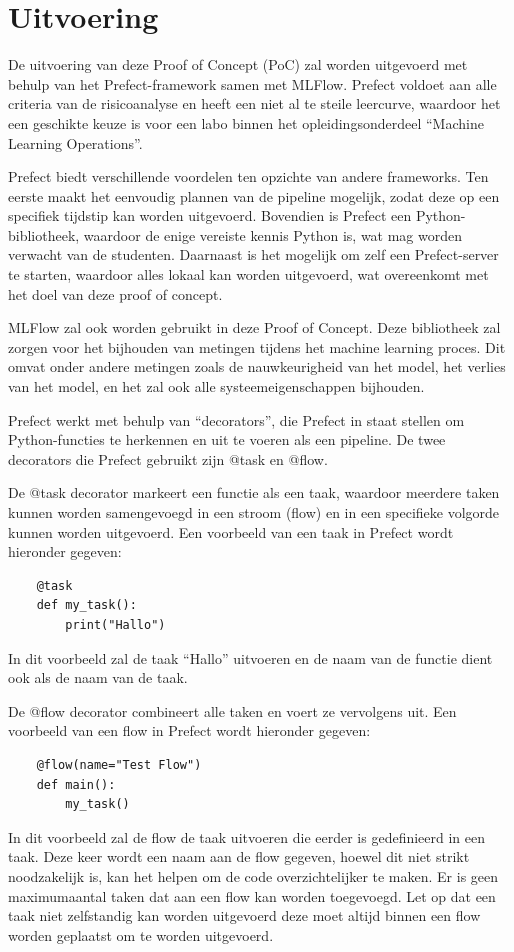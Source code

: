 \section{Uitvoering}
De uitvoering van deze Proof of Concept (PoC) zal worden uitgevoerd met behulp van het Prefect-framework samen met MLFlow. Prefect voldoet aan alle criteria van de risicoanalyse en heeft een niet al te steile leercurve, waardoor het een geschikte keuze is voor een labo binnen het opleidingsonderdeel ``Machine Learning Operations''.

Prefect biedt verschillende voordelen ten opzichte van andere frameworks. Ten eerste maakt het eenvoudig plannen van de pipeline mogelijk, zodat deze op een specifiek tijdstip kan worden uitgevoerd. Bovendien is Prefect een Python-bibliotheek, waardoor de enige vereiste kennis Python is, wat mag worden verwacht van de studenten. Daarnaast is het mogelijk om zelf een Prefect-server te starten, waardoor alles lokaal kan worden uitgevoerd, wat overeenkomt met het doel van deze proof of concept.

MLFlow zal ook worden gebruikt in deze Proof of Concept. Deze bibliotheek zal zorgen voor het bijhouden van metingen tijdens het machine learning proces. Dit omvat onder andere metingen zoals de nauwkeurigheid van het model, het verlies van het model, en het zal ook alle systeemeigenschappen bijhouden.

Prefect werkt met behulp van ``decorators'', die Prefect in staat stellen om Python-functies te herkennen en uit te voeren als een pipeline. De twee decorators die Prefect gebruikt zijn @task en @flow.

De @task decorator markeert een functie als een taak, waardoor meerdere taken kunnen worden samengevoegd in een stroom (flow) en in een specifieke volgorde kunnen worden uitgevoerd. Een voorbeeld van een taak in Prefect wordt hieronder gegeven:
\begin{verbatim}
    @task
    def my_task():
        print("Hallo")
\end{verbatim}

In dit voorbeeld zal de taak ``Hallo'' uitvoeren en de naam van de functie dient ook als de naam van de taak.

De @flow decorator combineert alle taken en voert ze vervolgens uit. Een voorbeeld van een flow in Prefect wordt hieronder gegeven:
\begin{verbatim}
    @flow(name="Test Flow")
    def main():
        my_task()
\end{verbatim}
In dit voorbeeld zal de flow de taak uitvoeren die eerder is gedefinieerd in een taak. Deze keer wordt een naam aan de flow gegeven, hoewel dit niet strikt noodzakelijk is, kan het helpen om de code overzichtelijker te maken. Er is geen maximumaantal taken dat aan een flow kan worden toegevoegd. Let op dat een taak niet zelfstandig kan worden uitgevoerd deze moet altijd binnen een flow worden geplaatst om te worden uitgevoerd.

